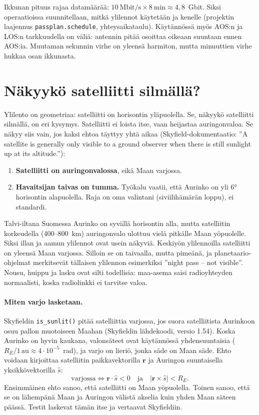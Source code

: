 \documentclass[a4paper,11pt]{article}
\newcommand{\koodi}[1]{\texttt{#1}}
\begin{document}
Ikkunan pituus rajaa datamäärää: $10\ \text{Mbit/s} \times 8\ \text{min} \approx 4,8$~Gbit. Siksi operaatioissa suunnitellaan, mitkä ylilennot käytetään ja kenelle (projektin laajennus \koodi{passplan.schedule}, yhteysaikataulu). Käytännössä myös AOS:n ja LOS:n tarkkuudella on väliä: antennin pitää osoittaa oikeaan suuntaan ennen AOS:ia. Muutaman sekunnin virhe on yleensä harmiton, mutta minuuttien virhe hukkaa osan ikkunasta.

\section{Näkyykö satelliitti silmällä?}\label{sec:nakyvyys}

Ylilento on geometriaa: satelliitti on horisontin yläpuolella. Se, näkyykö satelliitti silmällä, on eri kysymys. Satelliitti ei loista itse, vaan heijastaa auringonvaloa. Se näkyy siis vain, jos kaksi ehtoa täyttyy yhtä aikaa (Skyfield-dokumentaatio: ”A satellite is generally only visible to a ground observer when there is still sunlight up at its altitude.”):
\begin{enumerate}
  \item \textbf{Satelliitti on auringonvalossa}, eikä Maan varjossa.
  \item \textbf{Havaitsijan taivas on tumma.} Työkalu vaatii, että Aurinko on yli 6° horisontin alapuolella. Raja on oma valintani (siviilihämärän loppu), ei standardi.
\end{enumerate}

Talvi-iltana Suomessa Aurinko on syvällä horisontin alla, mutta satelliitin korkeudella (400–800~km) auringonvalo ulottuu vielä pitkälle Maan yöpuolelle. Siksi illan ja aamun ylilennot ovat usein näkyviä. Keskiyön ylilennoilla satelliitti on yleensä Maan varjossa. Silloin se on taivaalla, mutta pimeänä, ja planetaario-ohjelmat merkitsevät tällaisen ylilennon esimerkiksi ”night pass -- not visible”. Nousu, huippu ja lasku ovat silti todellisia: maa-asema saisi radioyhteyden normaalisti, koska radiolinkki ei tarvitse valoa.

\paragraph{Miten varjo lasketaan.} Skyfieldin \koodi{is\_sunlit()} pitää satelliittia varjossa, jos suora satelliitista Aurinkoon osuu pallon muotoiseen Maahan (Skyfieldin lähdekoodi, versio 1.54). Koska Aurinko on hyvin kaukana, valonsäteet ovat käytännössä yhdensuuntaisia ($R_E/1\,\text{au} \approx 4\cdot10^{-5}$~rad), ja varjo on lieriö, jonka säde on Maan säde. Ehto voidaan kirjoittaa satelliitin paikkavektorilla $\mathbf r$ ja Auringon suuntaisella yksikkövektorilla $\hat s$:
\[
\text{varjossa} \iff \mathbf r\cdot\hat s < 0 \quad\text{ja}\quad |\mathbf r\times\hat s| < R_E .
\]
Ensimmäinen ehto sanoo, että satelliitti on Maan yöpuolella. Toinen sanoo, että se on lähempänä Maan ja Auringon välistä akselia kuin yhden Maan säteen päässä. Testit laskevat tämän itse ja vertaavat Skyfieldiin.
\end{document}
